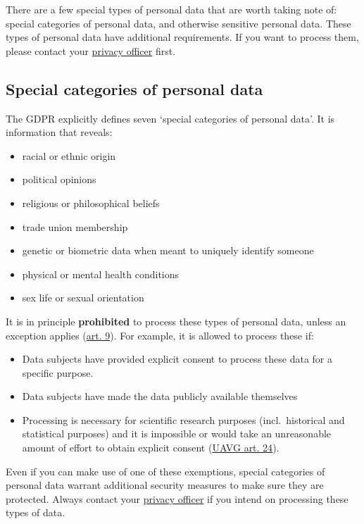 \documentclass[
]{book}
\providecommand{\tightlist}{%
  \setlength{\itemsep}{0pt}\setlength{\parskip}{0pt}}
\begin{document}
There are a few special types of personal data that are worth taking note of:
special categories of personal data, and otherwise sensitive personal data.
These types of personal data have additional requirements. If you want to
process them, please contact your \protect\hyperlink{support}{privacy officer} first.

\hypertarget{special-categories-of-personal-data}{%
\subsection{Special categories of personal data}\label{special-categories-of-personal-data}}

The GDPR explicitly defines seven `special categories of personal data'. It is
information that reveals:

\begin{itemize}
\tightlist
\item
  racial or ethnic origin
\item
  political opinions
\item
  religious or philosophical beliefs
\item
  trade union membership
\item
  genetic or biometric data when meant to uniquely identify someone
\item
  physical or mental health conditions
\item
  sex life or sexual orientation
\end{itemize}

It is in principle \textbf{prohibited} to process these types of personal data,
unless an exception applies
(\href{https://gdpr-info.eu/art-9-gdpr/}{art. 9}).
For example, it is allowed to process these if:

\begin{itemize}
\tightlist
\item
  Data subjects have provided explicit consent to process these data for a
  specific purpose.
\item
  Data subjects have made the data publicly available themselves
\item
  Processing is necessary for scientific research purposes (incl.~historical
  and statistical purposes) and it is impossible or would take an unreasonable
  amount of effort to obtain explicit consent
  (\href{https://wetten.overheid.nl/BWBR0040940/2021-07-01\#Hoofdstuk3}{UAVG art. 24}).
\end{itemize}

Even if you can make use of one of these exemptions, special categories of
personal data warrant additional security measures to make sure they are
protected. Always contact your \protect\hyperlink{support}{privacy officer} if you intend on
processing these types of data.
\end{document}

